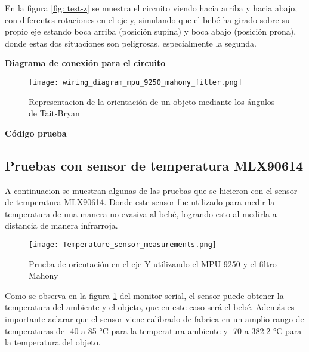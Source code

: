         En la figura \ref{fig: test-z} se muestra el circuito viendo hacia arriba y hacia abajo, con diferentes rotaciones en el eje y,
        simulando que el bebé ha girado sobre su propio eje estando boca arriba (posición supina) y boca abajo (posición prona), donde estas
        dos situaciones son peligrosas, especialmente la segunda.\newline

        \textbf{Diagrama de conexión para el circuito}
        \begin{figure}[htp!]
            \centering
                \texttt{[image: wiring\_diagram\_mpu\_9250\_mahony\_filter.png]}
                \caption{Representacion de la orientación de un objeto mediante los ángulos de Tait-Bryan}
            \end{figure}
            \FloatBarrier 
        \textbf{Código prueba}

        \lstset{style=mystyle}

        

        \subsection{Pruebas con sensor de temperatura MLX90614}

        A continuacion se muestran algunas de las pruebas que se hicieron con el sensor de temperatura MLX90614.
        Donde este sensor fue utilizado para medir la temperatura de una manera no evasiva al bebé, logrando esto 
        al medirla a distancia de manera infrarroja. 

        \begin{figure}[htp!]
            \centering
                 \texttt{[image: Temperature\_sensor\_measurements.png]}
                  \caption{Prueba de orientación en el eje-Y utilizando el MPU-9250 y el filtro Mahony}
                  \label{fig: temperature_measurements}
        \end{figure}
        \FloatBarrier 

        Como se observa en la figura \ref{fig: temperature_measurements} del monitor serial, el sensor puede obtener la temperatura del 
        ambiente y el objeto, que en este caso será el bebé. Además es importante aclarar que el sensor viene calibrado de fabrica en un amplio rango de temperaturas de 
        -40 a 85 °C para la temperatura ambiente y -70 a 382.2 °C para la temperatura del objeto.\newline

